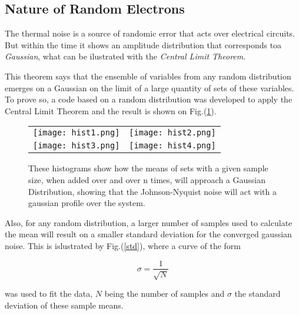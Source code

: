 \documentclass{article}
\begin{document}
{\subsection{Nature of Random Electrons}

The thermal noise is a source of randomic error that acts over
electrical circuits. But within the time it shows an amplitude
distribution that corresponds toa  \emph{Gaussian}, what can be
ilustrated with the \emph{Central Limit Theorem}. 

This theorem says that the ensemble of variables from any random
distribution emerges on a Gaussian on the limit of a large quantity of 
sets of these variables. To prove so, a code based on a random
distribution was developed to apply the Central Limit Theorem and the
result is shown on Fig.(\ref{hists}).

\begin{figure}[ht]

  \centering

  \begin{tabular}{cc}


    \texttt{[image: hist1.png]}&

    \texttt{[image: hist2.png]}\\

    \texttt{[image: hist3.png]}&

    \texttt{[image: hist4.png]}\\

  \end{tabular}

  \label{hists}\caption{These histograms show how the means
    of sets with a given sample size, when added over and over n times, 
  will approach a Gaussian Distribution, showing that the
  Johnson-Nyquist noise will act with a gaussian profile over the
  system.}

\end{figure}

Also, for any random distribution, a larger number of samples used to
calculate the mean will result on a smaller standard deviation for the
converged gaussian noise. This is islustrated by Fig.(\ref{std}), where
a curve of the form 

\begin{equation}
\sigma = \frac{1}{\sqrt{N}}
\label{p}
\end{equation}

was used to fit the data, $N$ being the number of samples and $\sigma$
the standard deviation of these sample means. 

}
\end{document}
